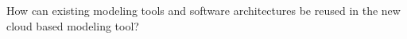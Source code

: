 How can existing modeling tools and software architectures be reused in the new \gls{cloud} based modeling tool?